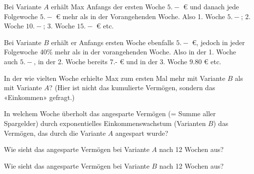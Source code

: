 Bei Variante $A$ erhält Max Anfangs der ersten Woche  $5.-$ \euro{} und danach jede Folgewoche $5.-$ \euro{} mehr als in der Vorangehenden Woche. Also 1. Woche $5.-$; 2. Woche $10.-$; 3. Woche $15.-$ \euro{} etc.

Bei Variante $B$ erhält er Anfangs ersten Woche ebenfalls $5.-$
\euro{}, jedoch in jeder Folgewoche 40\% mehr als in der vorangehenden
Woche. Also in der 1. Woche auch $5.-$, in der 2. Woche bereits 7.-
\euro{} und in der 3. Woche $9.80$ \euro{} etc.

\begin{bbwAufgabenBlock}
\item In der wie vielten  Woche erhielte Max zum ersten Mal mehr mit Variante $B$ als mit Variante $A$? (Hier ist nicht das kumulierte Vermögen, sondern das «Einkommen» gefragt.)

\item In welchem Woche überholt das angesparte Vermögen (= Summe aller
  Spargelder) durch exponentielles Einkommenswachstum (Varianten $B$) das Vermögen, das durch die Variante $A$ angespart wurde?

\item Wie sieht das angesparte Vermögen bei Variante $A$ nach 12 Wochen aus?

\item Wie sieht das angesparte Vermögen bei Variante $B$ nach 12 Wochen aus?
\end{bbwAufgabenBlock}
\platzFuerBerechnungenBisEndeSeite{}



\newpage
